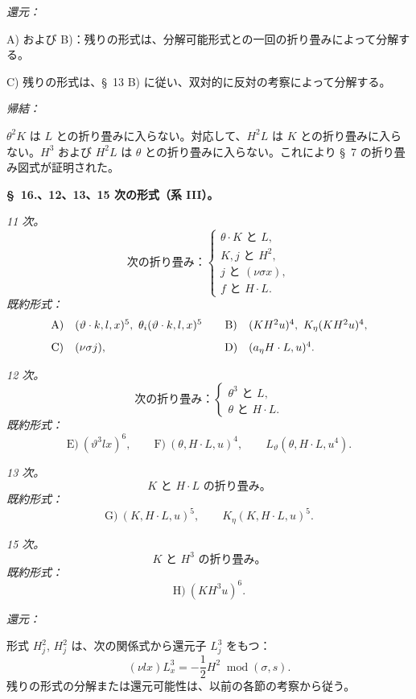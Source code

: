 \documentclass[11pt]{jlreq}
\newcommand{\modu}[1]{\;\operatorname{mod} #1}
\begin{document}
\noindent\emph{還元：}

A) および B)：残りの形式は、分解可能形式との一回の折り畳みによって分解する。

C) 残りの形式は、\S\ 13 B) に従い、双対的に反対の考察によって分解する。

\noindent\emph{帰結：}

$\theta^2K$ は $L$ との折り畳みに入らない。対応して、$H^2L$ は $K$ との折り畳みに入らない。$H^3$ および $H^2L$ は $\theta$ との折り畳みに入らない。これにより \S\ 7 の折り畳み図式が証明された。

\begin{center}
\textbf{\S\ 16.、12、13、15 次の形式（系 III）。}
\end{center}

\noindent\emph{11 次。}
\[
\text{次の折り畳み：}\left\{\begin{array}{l}
\theta\cdot K\text{ と }L,\\
K,j\text{ と }H^2,\\
j\text{ と }(\nu\sigma x),\\
f\text{ と }H\cdot L.
\end{array}\right.
\]
\noindent\emph{既約形式：}
\[
\begin{array}{c@{\quad}l@{\qquad}c@{\quad}l}
\text{A)}&(\vartheta\cdot k,l,x)^5,
\ \theta_i(\vartheta\cdot k,l,x)^5&
\text{B)}&(KH^2u)^4,
\ K_\eta(KH^2u)^4,\\[0.8em]
\text{C)}&(\nu\sigma j),&
\text{D)}&(a_\eta H\cdot L,u)^4.
\end{array}
\]

\noindent\emph{12 次。}
\[
\text{次の折り畳み：}\left\{\begin{array}{l}
\theta^3\text{ と }L,\\
\theta\text{ と }H\cdot L.
\end{array}\right.
\]
\noindent\emph{既約形式：}
\[
\text{E)}\ (\vartheta^3lx)^6,
\qquad
\text{F)}\ (\theta,H\cdot L,u)^4,
\qquad L_\vartheta(\theta,H\cdot L,u^4).
\]

\noindent\emph{13 次。}
\[
K\text{ と }H\cdot L\text{ の折り畳み。}
\]
\noindent\emph{既約形式：}
\[
\text{G)}\ (K,H\cdot L,u)^5,
\qquad K_\eta(K,H\cdot L,u)^5.
\]

\noindent\emph{15 次。}
\[
K\text{ と }H^3\text{ の折り畳み。}
\]
\noindent\emph{既約形式：}
\[
\text{H)}\ (KH^3u)^6.
\]

\noindent\emph{還元：}

形式 $H_j^2$, $H_j^2$ は、次の関係式から還元子 $L_j^3$ をもつ：
\[
(\nu lx)L_x^3=-\frac12H^2\modu{(\sigma,s)}.
\]
残りの形式の分解または還元可能性は、以前の各節の考察から従う。
\end{document}
